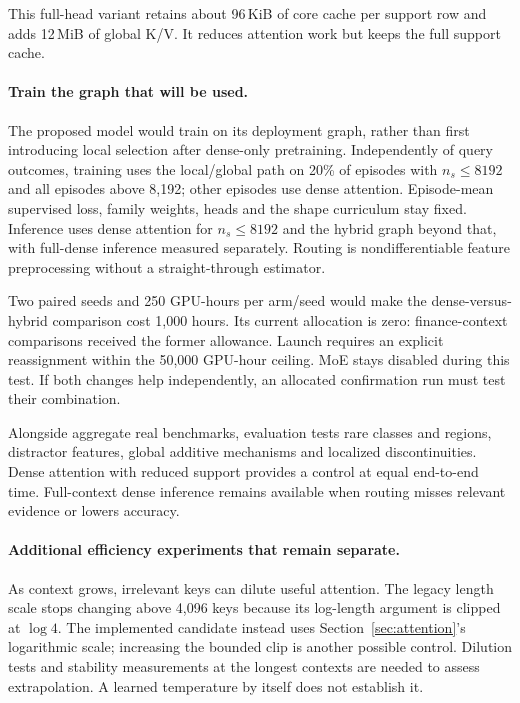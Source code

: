 \documentclass[11pt]{article}
\begin{document}
This full-head variant retains about 96\,KiB of core cache per support row and adds 12\,MiB of global K/V. It reduces attention work but keeps the full support cache.

\paragraph{Train the graph that will be used.}
The proposed model would train on its deployment graph, rather than first introducing local selection after dense-only pretraining. Independently of query outcomes, training uses the local/global path on 20\% of episodes with $n_s\leq8192$ and all episodes above 8,192; other episodes use dense attention. Episode-mean supervised loss, family weights, heads and the shape curriculum stay fixed. Inference uses dense attention for $n_s\leq8192$ and the hybrid graph beyond that, with full-dense inference measured separately. Routing is nondifferentiable feature preprocessing without a straight-through estimator.

Two paired seeds and 250 GPU-hours per arm/seed would make the dense-versus-hybrid comparison cost 1,000 hours. Its current allocation is zero: finance-context comparisons received the former allowance. Launch requires an explicit reassignment within the 50,000 GPU-hour ceiling. MoE stays disabled during this test. If both changes help independently, an allocated confirmation run must test their combination.

Alongside aggregate real benchmarks, evaluation tests rare classes and regions, distractor features, global additive mechanisms and localized discontinuities. Dense attention with reduced support provides a control at equal end-to-end time. Full-context dense inference remains available when routing misses relevant evidence or lowers accuracy.

\paragraph{Additional efficiency experiments that remain separate.}
As context grows, irrelevant keys can dilute useful attention. The legacy length scale stops changing above 4,096 keys because its log-length argument is clipped at $\log4$. The implemented candidate instead uses Section~\ref{sec:attention}'s logarithmic scale; increasing the bounded clip is another possible control. Dilution tests and stability measurements at the longest contexts are needed to assess extrapolation. A learned temperature by itself does not establish it.
\end{document}

